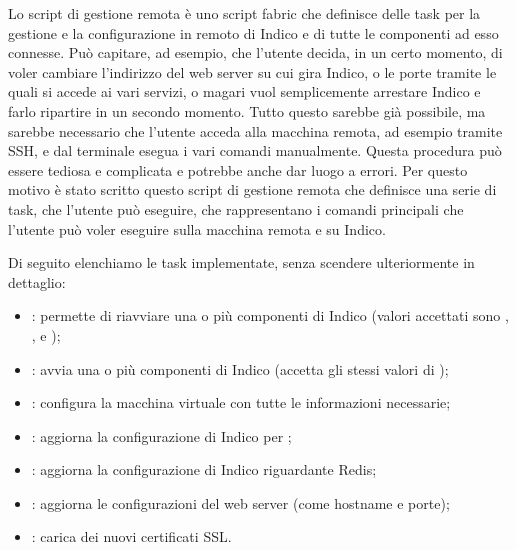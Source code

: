         Lo script di gestione remota è uno script fabric che definisce delle task per la gestione e la configurazione in remoto di Indico e di tutte le componenti ad esso connesse. Può capitare, ad esempio, che l'utente decida, in un certo momento, di voler cambiare l'indirizzo del web server su cui gira Indico, o le porte tramite le quali si accede ai vari servizi, o magari vuol semplicemente arrestare Indico e farlo ripartire in un secondo momento. Tutto questo sarebbe già possibile, ma sarebbe necessario che l'utente acceda alla macchina remota, ad esempio tramite \ac{SSH}, e dal terminale esegua i vari comandi manualmente. Questa procedura può essere tediosa e complicata e potrebbe anche dar luogo a errori. Per questo motivo è stato scritto questo script di gestione remota che definisce una serie di task, che l'utente può eseguire, che rappresentano i comandi principali che l'utente può voler eseguire sulla macchina remota e su Indico.
        
        Di seguito elenchiamo le task implementate, senza scendere ulteriormente in dettaglio:
        
        \begin{itemize}
            \item {}: permette di riavviare una o più componenti di Indico (valori accettati sono , ,  e );
            \item {}: avvia una o più componenti di Indico (accetta gli stessi valori di );
            \item {}: configura la macchina virtuale con tutte le informazioni necessarie;
            \item {}: aggiorna la configurazione di Indico per ;
            \item {}: aggiorna la configurazione di Indico riguardante Redis;
            \item {}: aggiorna le configurazioni del web server (come hostname e porte);
            \item {}: carica dei nuovi certificati \ac{SSL}.
        \end{itemize}
    